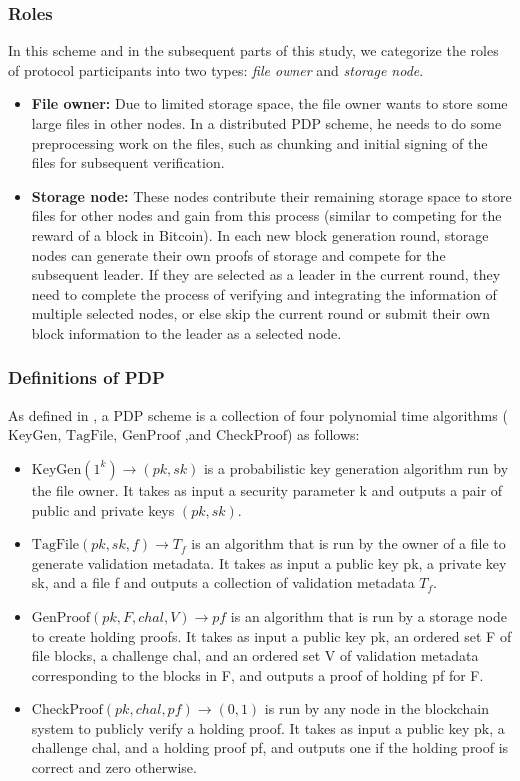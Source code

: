 \documentclass[journal]{IEEEtran}
\begin{document}
\subsubsection{Roles}
In this scheme and in the subsequent parts of this study, we categorize the roles of protocol participants into two types: \textit{file owner} and \textit{storage node}.
\begin{itemize}
    \item \textbf{File owner: }
    Due to limited storage space, the file owner wants to store some large files in other nodes. In a distributed PDP scheme, he needs to do some preprocessing work on the files, such as chunking and initial signing of the files for subsequent verification.
    \item \textbf{Storage node: }
    These nodes contribute their remaining storage space to store files for other nodes and gain from this process (similar to competing for the reward of a block in Bitcoin). In each new block generation round, storage nodes can generate their own proofs of storage and compete for the subsequent leader. If they are selected as a leader in the current round, they need to complete the process of verifying and integrating the information of multiple selected nodes, or else skip the current round or submit their own block information to the leader as a selected node.
\end{itemize}


\subsubsection{Definitions of PDP}
As defined in \cite{2007pdp}, a PDP scheme is a collection of four polynomial time algorithms ($\text{KeyGen}$, $\text{TagFile}$, $\text{GenProof}$ ,and $\text{CheckProof}$) as follows:
\begin{itemize}
    \item $\text{KeyGen}(1^{k})\rightarrow(pk,sk)$ 
    is a probabilistic key generation algorithm run by the file owner. It takes as input a security parameter k and outputs a pair of public and private keys $(pk,sk)$.
    \item $\text{TagFile}(pk,sk,f)\rightarrow T_{f}$ 
    is an algorithm that is run by the owner of a file to generate validation metadata. It takes as input a public key pk, a private key sk, and a file f and outputs a collection of validation metadata $T_{f}$.
    \item $\text{GenProof}(pk,F,chal,V)\rightarrow pf$ 
    is an algorithm that is run by a storage node to create holding proofs. It takes as input a public key pk, an ordered set F of file blocks, a challenge chal, and an ordered set V of validation metadata corresponding to the blocks in F, and outputs a proof of holding pf for F.
    \item $\text{CheckProof}(pk,chal,pf)\rightarrow(0,1)$ 
    is run by any node in the blockchain system to publicly verify a holding proof. It takes as input a public key pk, a challenge chal, and a holding proof pf, and outputs one if the holding proof is correct and zero otherwise.
\end{itemize}
\end{document}
